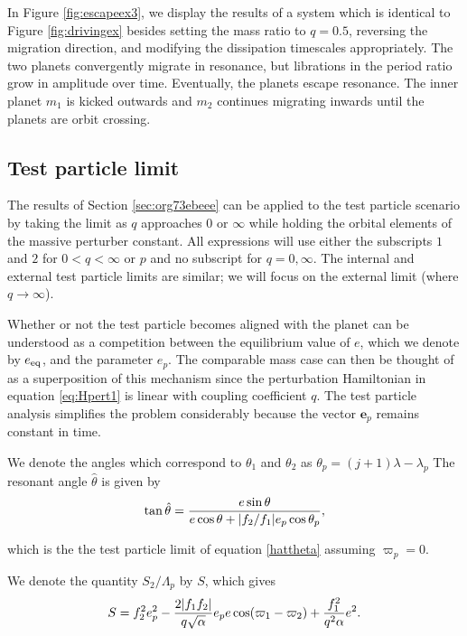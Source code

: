 \documentclass[usenatbib,twocolumn]{mnras}
\DeclarePairedDelimiter{\abs}{|}{|}
\begin{document}
In Figure \ref{fig:escapeex3}, we display the results of a system which
is identical to Figure \ref{fig:drivingex} besides setting the mass
ratio to \(q=0.5\), reversing the migration direction, and modifying the
dissipation timescales appropriately.  The two planets convergently
migrate in resonance, but librations in the period ratio grow in
amplitude over time. Eventually, the planets escape resonance. The
inner planet \(m_1\) is kicked outwards and \(m_2\) continues migrating
inwards until the planets are orbit crossing.

\subsection{Test particle limit}
\label{sec:org9bdc80f}
The results of Section \ref{sec:org73ebeee} can be applied to the
test particle scenario by taking the limit as \(q\) approaches \(0\) or
\(\infty\) while holding the orbital elements of the massive perturber
constant.  All expressions will use either the subscripts \(1\) and \(2\)
for \(0<q<\infty\) or \(p\) and no subscript for \(q=0,\infty\).  The
internal and external test particle limits are similar; we will focus
on the external limit (where \(q\to\infty\)).

Whether or not the test particle becomes aligned with the planet can
be understood as a competition between the equilibrium value of \(e\), which
we denote by \(e_{\rm eq}\),
and the parameter \(e_p\). The comparable mass case can then be thought
of as a superposition of this mechanism since the perturbation
Hamiltonian in equation \eqref{eq:Hpert1} is linear with coupling
coefficient \(q\). The test particle
analysis simplifies the problem considerably because the vector
\(\mathbf{e}_p\) remains constant in time. 

We denote the angles which correspond to \(\theta_1\) and \(\theta_2\) as \(\theta_p=(j+1)\lambda-\lambda_p\)
The resonant angle \(\hat\theta\) is given by
\begin{align}
  \tan\hat\theta = \frac{e\sin\theta}{e\cos\theta + \abs{f_2/f_1}e_p\cos\theta_p},
\end{align}

\noindent
which is the the test particle limit of equation
\eqref{hattheta} assuming \(\varpi_p=0\).

We denote the quantity \(S_2/\Lambda_p\) by \(S\), which gives
\begin{align}
S =  f_2^2e_p^2 - \frac{2\abs{f_1f_2}}{q\sqrt{\alpha}}e_pe\cos(\varpi_1-\varpi_2)
+ \frac{f_1^2}{q^2\alpha}e^2.
\end{align}
\end{document}
